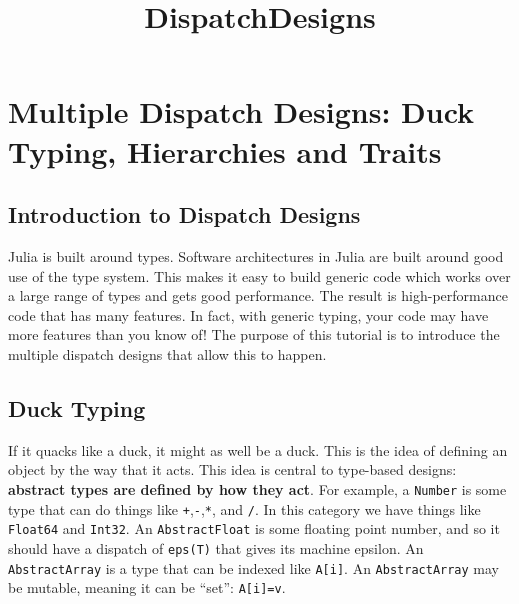\documentclass[11pt]{article}
\title{DispatchDesigns}
\begin{document}
    
    
    \maketitle
    
    

    
    \hypertarget{multiple-dispatch-designs-duck-typing-hierarchies-and-traits}{%
\section{Multiple Dispatch Designs: Duck Typing, Hierarchies and
Traits}\label{multiple-dispatch-designs-duck-typing-hierarchies-and-traits}}

\hypertarget{introduction-to-dispatch-designs}{%
\subsection{Introduction to Dispatch
Designs}\label{introduction-to-dispatch-designs}}

Julia is built around types. Software architectures in Julia are built
around good use of the type system. This makes it easy to build generic
code which works over a large range of types and gets good performance.
The result is high-performance code that has many features. In fact,
with generic typing, your code may have more features than you know of!
The purpose of this tutorial is to introduce the multiple dispatch
designs that allow this to happen.

    \hypertarget{duck-typing}{%
\subsection{Duck Typing}\label{duck-typing}}

If it quacks like a duck, it might as well be a duck. This is the idea
of defining an object by the way that it acts. This idea is central to
type-based designs: \textbf{abstract types are defined by how they act}.
For example, a \texttt{Number} is some type that can do things like
\texttt{+},\texttt{-},\texttt{*}, and \texttt{/}. In this category we
have things like \texttt{Float64} and \texttt{Int32}. An
\texttt{AbstractFloat} is some floating point number, and so it should
have a dispatch of \texttt{eps(T)} that gives its machine epsilon. An
\texttt{AbstractArray} is a type that can be indexed like
\texttt{A{[}i{]}}. An \texttt{AbstractArray} may be mutable, meaning it
can be ``set'': \texttt{A{[}i{]}=v}.
\end{document}
